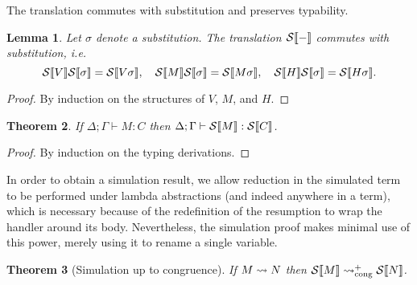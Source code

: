 \documentclass[12pt,phd,lfcs,twoside,openright,logo,leftchapter,normalheadings]{infthesis}
\theoremstyle{plain}
\newtheorem{theorem}{Theorem}[chapter]
\newtheorem{lemma}[theorem]{Lemma}
\theoremstyle{definition}
\begin{document}
The translation commutes with substitution and preserves typability.
%
\begin{lemma}\label{lem:dstrans-subst}
  Let $\sigma$ denote a substitution. The translation $\mathcal{S}\llbracket - \rrbracket$
  commutes with substitution, i.e.
  \[
    \mathcal{S}\llbracket V \rrbracket\mathcal{S}\llbracket \sigma \rrbracket = \mathcal{S}\llbracket V\sigma \rrbracket,\quad
    \mathcal{S}\llbracket M \rrbracket\mathcal{S}\llbracket \sigma \rrbracket = \mathcal{S}\llbracket M\sigma \rrbracket,\quad
    \mathcal{S}\llbracket H \rrbracket\mathcal{S}\llbracket \sigma \rrbracket = \mathcal{S}\llbracket H\sigma \rrbracket.
  \]
\end{lemma}
%
\begin{proof}
  By induction on the structures of $V$, $M$, and $H$.
\end{proof}

\begin{theorem}
If $\Delta; \Gamma \vdash M : C$ then $\Delta; \Gamma \vdash
\mathcal{S}\llbracket M \rrbracket : \mathcal{S}\llbracket C \rrbracket$.
\end{theorem}
%
\begin{proof}
  By induction on the typing derivations.
\end{proof}

In order to obtain a simulation result, we allow reduction in the
simulated term to be performed under lambda abstractions (and indeed
anywhere in a term), which is necessary because of the redefinition of
the resumption to wrap the handler around its body.
%
Nevertheless, the simulation proof makes minimal use of this power,
merely using it to rename a single variable.
%

\begin{theorem}[Simulation up to congruence]
If $M \leadsto N$ then $\mathcal{S}\llbracket M \rrbracket \leadsto_{\mathrm{cong}}^+
\mathcal{S}\llbracket N \rrbracket$.
\end{theorem}
\end{document}

